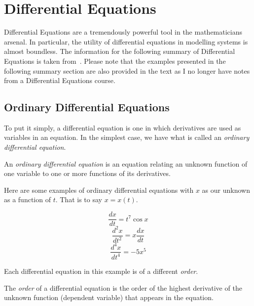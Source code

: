 
\section{Differential Equations} %

Differential Equations are a tremendously powerful tool in the mathematicians arsenal. In particular, the utility of differential equations in modelling systems is almost boundless.
The information for the following summary of Differential Equations is taken from~\cite{DiffEq}. Please note that the examples presented in the following summary section are also provided in the text as I no longer have notes from a Differential Equations course.

\subsection{Ordinary Differential Equations}

To put it simply, a differential equation is one in which derivatives are used as variables in an equation. In the simplest case, we have what is called an \emph{ordinary differential equation}.

\begin{definition}
An \emph{ordinary differential equation} is an equation relating an unknown function of one variable to one or more functions of its derivatives.
\end{definition}

Here are some examples of ordinary differential equations with $x$ as our unknown as a function of $t$. That is to say $x = x(t).$

\begin{example}
$$\frac{dx}{dt}=t^7\cos x$$
$$\frac{d^2 x}{dt^2} = x \frac{dx}{dt}$$
$$\frac{d^4 x}{dt^4} = -5 x^5$$
\end{example}

Each differential equation in this example is of a different \emph{order}.

\begin{definition}
The \emph{order} of a differential equation is the order of the highest derivative of the unknown function (dependent variable) that appears in the equation.
\end{definition}

